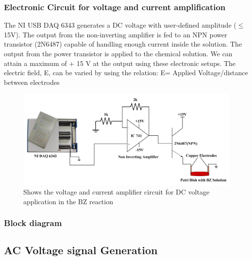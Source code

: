 \documentclass[journal=jacsat,manuscript=article]{achemso}
\begin{document}
\subsubsection{Electronic Circuit for voltage and current amplification}
The NI USB DAQ 6343 generates a DC voltage with user-defined
amplitude ($\leq$15V). The output from the non-inverting amplifier is fed to an
NPN power transistor (2N6487) capable of handling enough current
inside the solution. The output from the power transistor is applied
to the chemical solution. We can attain a maximum of + 15 V at the
output using these electronic setups. The electric field, E, can be
varied by using the relation: E= Applied Voltage/distance between
electrodes

\begin{figure}[H]
    \centering
    \includegraphics[width=\linewidth]{pulse circuit - Copy.jpg}
    \caption{Shows the voltage and current amplifier circuit for DC
      voltage application in the BZ reaction}
    \label{fig:ex2}
\end{figure}



\subsubsection{Block diagram}
 

\subsection{AC Voltage signal Generation}
\end{document}
